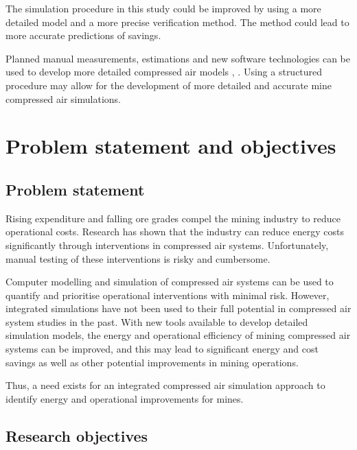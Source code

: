 		\par 
		 The simulation procedure in this study could be improved by using a more detailed model and a more precise verification method. The method could lead to more accurate predictions of savings. 
		\par
		Planned manual measurements, estimations and new software technologies can be used to develop more detailed compressed air models \cite{Bredenkamp2015Challeges}, \cite{Mare2017Evaluating}. Using a structured procedure may allow for the development of more detailed and accurate mine compressed air simulations.
		

\section{Problem statement and objectives}
	\subsection{Problem statement}
 		Rising expenditure and falling ore grades compel the mining industry to reduce operational costs. Research has shown that the industry can reduce energy costs significantly through interventions in compressed air systems. Unfortunately, manual testing of these interventions is risky and cumbersome.
 		\par
 		Computer modelling and simulation of compressed air systems can be used to quantify and prioritise operational interventions with minimal risk. However, integrated simulations have not been used to their full potential in compressed air system studies in the past. With new tools available to develop detailed simulation models, the energy and operational efficiency of mining compressed air systems can be improved, and this may lead to significant energy and cost savings as well as other potential improvements in mining operations.
 		\par 
 		Thus, a need exists for an integrated compressed air simulation approach to identify energy and operational improvements for mines.
 			\subsection{Research objectives}
 			
